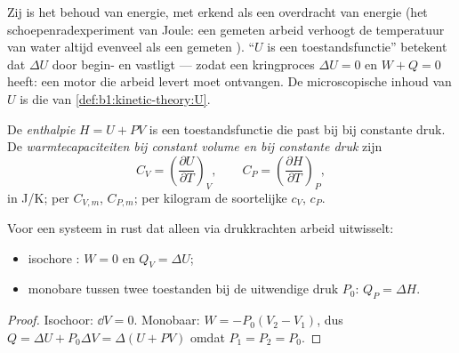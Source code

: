 \begin{remark}\label{rem:b1:first-law:meaning}
Zij is het behoud van energie, met  erkend als een overdracht van
energie (het schoepenradexperiment van Joule: een gemeten arbeid verhoogt de
temperatuur van water altijd evenveel als een gemeten ). ``$U$ is een
toestandsfunctie'' betekent dat $\Delta U$ door begin- en  vastligt ---
zodat een kringproces $\Delta U = 0$ en $W + Q = 0$ heeft: een motor die
arbeid levert moet  ontvangen. De microscopische inhoud van $U$ is die van
\cref{def:b1:kinetic-theory:U}.
\end{remark}

\begin{definition}\label{def:b1:first-law:enthalpy}
De \emph{enthalpie} $H = U + PV$ is een toestandsfunctie die past bij
 bij constante druk. De \emph{warmtecapaciteiten bij
constant volume en bij constante druk} zijn
\[
C_V = \left(\frac{\partial U}{\partial T}\right)_V, \qquad
C_P = \left(\frac{\partial H}{\partial T}\right)_P ,
\]
in \unit{J/K}; per  $C_{V,m}$, $C_{P,m}$; per kilogram de soortelijke
 $c_V$, $c_P$.
\end{definition}

\begin{proposition}\label{prop:b1:first-law:qvqp}
Voor een systeem in rust dat alleen via drukkrachten arbeid uitwisselt:
\begin{itemize}
  \item isochore : $W = 0$ en $Q_V = \Delta U$;
  \item monobare  tussen twee toestanden bij de uitwendige
        druk $P_0$: $Q_P = \Delta H$.
\end{itemize}
\end{proposition}

\begin{proof}
Isochoor: $\dd V = 0$. Monobaar: $W = -P_0(V_2 - V_1)$, dus $Q = \Delta U +
P_0\Delta V = \Delta(U + PV)$ omdat $P_1 = P_2 = P_0$.
\end{proof}

